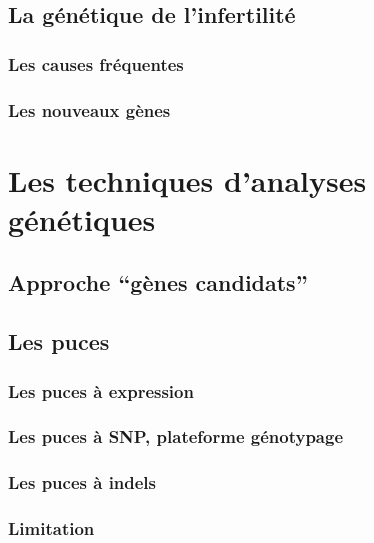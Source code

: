 \documentclass[12pt,a4paper,twoside]{ugathesis}
\begin{document}
\subsection{La génétique de
l'infertilité}\label{la-genetique-de-linfertilite}

\subsubsection{Les causes fréquentes}\label{les-causes-frequentes}

\subsubsection{Les nouveaux gènes}\label{les-nouveaux-genes}

\section{Les techniques d'analyses
génétiques}\label{les-techniques-danalyses-genetiques}

\subsection{\texorpdfstring{Approche ``gènes
candidats''}{Approche gènes candidats}}\label{approche-genes-candidats}

\subsection{Les puces}\label{les-puces}

\subsubsection{Les puces à expression}\label{les-puces-a-expression}

\subsubsection{Les puces à SNP, plateforme
génotypage}\label{les-puces-a-snp-plateforme-genotypage}

\subsubsection{Les puces à indels}\label{les-puces-a-indels}

\subsubsection{Limitation}\label{limitation}
\end{document}
